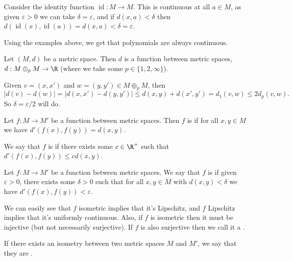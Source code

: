 \begin{example}
    Consider the identity function $\operatorname{id}: M \rightarrow M$. This is continuous at all $a \in M$, as given $\varepsilon > 0$ we can take $\delta = \varepsilon$, and if $d(x, a) < \delta$ then $d(\operatorname{id}(x), \operatorname{id}(a)) = d(x, a) < \delta = \varepsilon$.
\end{example}

\begin{example}[Polynomials]
    Using the examples above, we get that polynomials are always continuous.
\end{example}

\begin{example}
    Let $(M, d)$ be a metric space. Then $d$ is a function between metric spaces, $d: M \oplus_p M \rightarrow \R$ (where we take some $p \in \{1, 2, \infty\}$).

    Given $v = (x, x')$ and $w = (y, y') \in M \oplus_p M$, then
    $$|d(v) - d(w)| = |d(x, x') - d(y, y')| \leq d(x, y) + d(x', y') = d_1(v, w) \leq 2d_p(v, w).$$
    So $\delta = \varepsilon/2$ will do.
\end{example}

\begin{definition}
    Let $f: M \rightarrow M'$ be a function between metric spaces. Then $f$ is  if for all $x, y \in M$ we have $d'(f(x), f(y)) = d(x, y)$.

    We say that $f$ is  if there exists some $c \in \R^+$ such that $d'(f(x), f(y)) \leq cd(x, y)$.
\end{definition}

\begin{definition}
    Let $f: M \rightarrow M'$ be a function between metric spaces. We say that $f$ is  if given $\varepsilon > 0$, there exists some $\delta > 0$ such that for all $x, y \in M$ with $d(x, y) < \delta$ we have $d'(f(x), f(y)) < \varepsilon$. 
\end{definition}

We can easily see that $f$ isometric implies that it's Lipschitz, and $f$ Lipschitz implies that it's uniformly continuous. Also, if $f$ is isometric then it must be injective (but not necessarily surjective). If $f$ is also surjective then we call it a .

If there exists an isometry between two metric spaces $M$ and $M'$, we say that they are .

